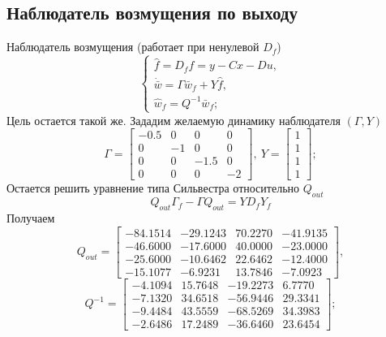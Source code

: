 \documentclass[a4paper, 12pt]{article}
\begin{document}
    \subsection{Наблюдатель возмущения по выходу}
    Наблюдатель возмущения (работает при ненулевой $D_f$)
    $$
    \begin{cases}
        \hat{f}=D_ff=y-Cx-Du,\\
        \dot{\bar{w}}=\Gamma\bar{w}_f+Y\hat{f},\\
        \hat{w}_f=Q^{-1}\bar{w}_f;
    \end{cases}
    $$
    Цель остается такой же. Зададим желаемую динамику наблюдателя $\left( \Gamma,Y \right)$
    $$
    \Gamma=\begin{bmatrix}
        -0.5 &0 &0 &0\\
        0 &-1 &0 &0\\
        0 &0 &-1.5 &0\\
        0 &0 &0 &-2
    \end{bmatrix},\ Y=\begin{bmatrix}
        1\\1\\1\\1
    \end{bmatrix};
    $$
    Остается решить уравнение типа Сильвестра относительно $Q_{out}$
    $$
    Q_{out}\Gamma_f-\Gamma Q_{out}=YD_fY_f
    $$
    Получаем
    $$
    Q_{out}=\begin{bmatrix}
    -84.1514  &-29.1243   &70.2270  &-41.9135\\
  -46.6000  &-17.6000   &40.0000  &-23.0000\\
  -25.6000  &-10.6462   &22.6462  &-12.4000\\
  -15.1077   &-6.9231   &13.7846   &-7.0923
    \end{bmatrix},
    $$
    $$
    Q^{-1}=\begin{bmatrix}
        -4.1094   &15.7648  &-19.2273    &6.7770\\
   -7.1320   &34.6518  &-56.9446   &29.3341\\
   -9.4484   &43.5559  &-68.5269   &34.3983\\
   -2.6486   &17.2489  &-36.6460   &23.6454
    \end{bmatrix};
    $$
\end{document}
